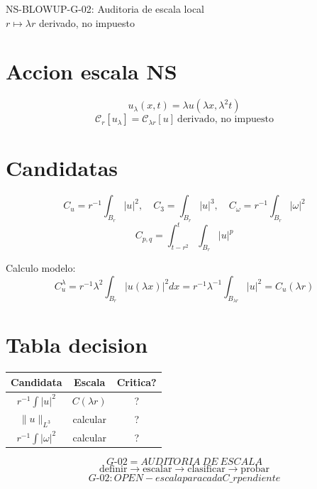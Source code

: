 \documentclass{article}
\begin{document}
\begin{center}
{\Large NS-BLOWUP-G-02: Auditoria de escala local}\\
$r\mapsto\lambda r$ derivado, no impuesto
\end{center}

\section*{Accion escala NS}
\[
u_\lambda(x,t)=\lambda u(\lambda x,\lambda^2 t)
\]
\[
\boxed{\mathcal C_r[u_\lambda]=\mathcal C_{\lambda r}[u]\ \text{derivado, no impuesto}}
\]

\section*{Candidatas}
\[
C_u=r^{-1}\int_{B_r}|u|^2,\quad C_3=\int_{B_r}|u|^3,\quad C_\omega=r^{-1}\int_{B_r}|\omega|^2
\]
\[
C_{p,q}=\int_{t-r^2}^{t}\int_{B_r}|u|^p
\]

Calculo modelo:
\[
C_u^\lambda=r^{-1}\lambda^2\int_{B_r}|u(\lambda x)|^2 dx=r^{-1}\lambda^{-1}\int_{B_{\lambda r}}|u|^2=C_u(\lambda r)
\]

\section*{Tabla decision}
\begin{center}
\begin{tabular}{|c|c|c|}
\hline
Candidata & Escala & Critica?\\
\hline
$r^{-1}\int|u|^2$ & $C(\lambda r)$ & ?\\
\hline
$\|u\|_{L^3}$ & calcular & ?\\
\hline
$r^{-1}\int|\omega|^2$ & calcular & ?\\
\hline
\end{tabular}
\end{center}

\[
\boxed{G\text{-}02=AUDITORIA\ DE\ ESCALA}
\]
\[
\boxed{\text{definir}\to\text{escalar}\to\text{clasificar}\to\text{probar}}
\]
\[
\boxed{G\text{-}02: OPEN - escala para cada C\_r pendiente}
\]
\end{document}
